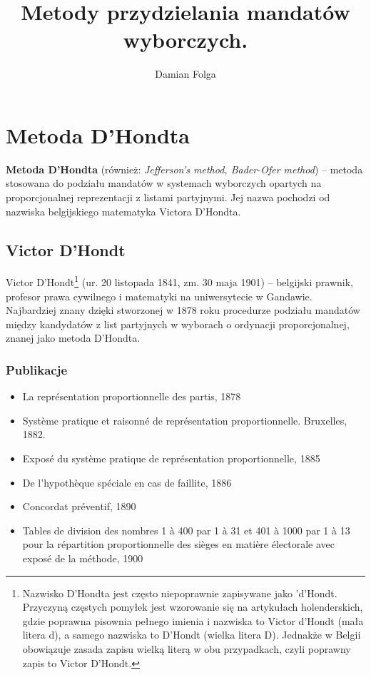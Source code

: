 \documentclass[12pt,a4paper,titlepage]{report}
\author{Damian Folga}
\title{\textbf{Metody przydzielania mandatów wyborczych.}}
\begin{document}
\maketitle
\tableofcontents
\newpage
\chapter{Metoda D'Hondta}
\textbf{Metoda D’Hondta} (również: \textit{Jefferson’s method, Bader-Ofer method}) – metoda stosowana do podziału mandatów w systemach wyborczych opartych na proporcjonalnej reprezentacji z listami partyjnymi. Jej nazwa pochodzi od nazwiska belgijskiego matematyka Victora D’Hondta.
\section{Victor D'Hondt}
Victor D’Hondt\footnote{ Nazwisko D’Hondta jest często niepoprawnie zapisywane jako 'd’Hondt. Przyczyną częstych pomyłek jest wzorowanie się na artykułach holenderskich, gdzie poprawna pisownia pełnego imienia i nazwiska to Victor d’Hondt (mała litera d), a samego nazwiska to D’Hondt (wielka litera D). Jednakże w Belgii obowiązuje zasada zapisu wielką literą w obu przypadkach, czyli poprawny zapis to Victor D’Hondt.} (ur. 20 listopada 1841, zm. 30 maja 1901) – belgijski prawnik, profesor prawa cywilnego i matematyki na uniwersytecie w Gandawie. Najbardziej znany dzięki stworzonej w 1878 roku procedurze podziału mandatów między kandydatów z list partyjnych w wyborach o ordynacji proporcjonalnej, znanej jako metoda D’Hondta.
\newpage
\subsection{Publikacje}
\begin{itemize}
\item{La représentation proportionnelle des partis, 1878}
\item{Système pratique et raisonné de représentation proportionnelle. Bruxelles, 1882.}
\item{Exposé du système pratique de représentation proportionnelle, 1885}
\item{De l'hypothèque spéciale en cas de faillite, 1886}
\item{Concordat préventif, 1890}
\item{Tables de division des nombres 1 à 400 par 1 à 31 et 401 à 1000 par 1 à 13 pour la répartition proportionnelle des sièges en matière électorale avec exposé de la méthode, 1900}
\end{itemize}
\end{document}
